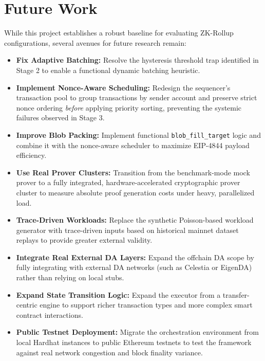 \section{Future Work}
\label{sec:future_work}
While this project establishes a robust baseline for evaluating ZK-Rollup configurations, several avenues for future research remain:
\begin{itemize}
    \item \textbf{Fix Adaptive Batching:} Resolve the hysteresis threshold trap identified in Stage 2 to enable a functional dynamic batching heuristic.
    \item \textbf{Implement Nonce-Aware Scheduling:} Redesign the sequencer's transaction pool to group transactions by sender account and preserve strict nonce ordering \textit{before} applying priority sorting, preventing the systemic failures observed in Stage 3.
    \item \textbf{Improve Blob Packing:} Implement functional \texttt{blob\_fill\_target} logic and combine it with the nonce-aware scheduler to maximize EIP-4844 payload efficiency.
    \item \textbf{Use Real Prover Clusters:} Transition from the benchmark-mode mock prover to a fully integrated, hardware-accelerated cryptographic prover cluster to measure absolute proof generation costs under heavy, parallelized load.
    \item \textbf{Trace-Driven Workloads:} Replace the synthetic Poisson-based workload generator with trace-driven inputs based on historical mainnet dataset replays to provide greater external validity.
    \item \textbf{Integrate Real External DA Layers:} Expand the offchain DA scope by fully integrating with external DA networks (such as Celestia or EigenDA) rather than relying on local stubs.
    \item \textbf{Expand State Transition Logic:} Expand the executor from a transfer-centric engine to support richer transaction types and more complex smart contract interactions.
    \item \textbf{Public Testnet Deployment:} Migrate the orchestration environment from local Hardhat instances to public Ethereum testnets to test the framework against real network congestion and block finality variance.
\end{itemize}
